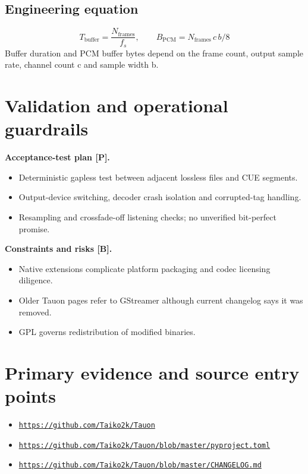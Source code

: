\documentclass[10pt,a4paper,oneside]{report}
\newcommand{\sourceurl}[1]{\href{#1}{\texttt{\nolinkurl{#1}}}}
\begin{document}
\subsection*{Engineering equation}
\begin{equation*}T_{\mathrm{buffer}}=\frac{N_{\mathrm{frames}}}{f_s},\qquad B_{\mathrm{PCM}}=N_{\mathrm{frames}}\,c\,b/8\end{equation*}
Buffer duration and PCM buffer bytes depend on the frame count, output sample rate, channel count c and sample width b.\par
\section{Validation and operational guardrails}
\textbf{Acceptance-test plan [P].}\par
\begin{itemize}[leftmargin=*,itemsep=2pt,topsep=3pt]
\item Deterministic gapless test between adjacent lossless files and CUE segments.
\item Output-device switching, decoder crash isolation and corrupted-tag handling.
\item Resampling and crossfade-off listening checks; no unverified bit-perfect promise.
\end{itemize}
\textbf{Constraints and risks [B].}\par
\begin{itemize}[leftmargin=*,itemsep=2pt,topsep=3pt]
\item Native extensions complicate platform packaging and codec licensing diligence.
\item Older Tauon pages refer to GStreamer although current changelog says it was removed.
\item GPL governs redistribution of modified binaries.
\end{itemize}
\section*{Primary evidence and source entry points}
\begin{itemize}[leftmargin=*,itemsep=1pt,topsep=1pt]
\item \sourceurl{https://github.com/Taiko2k/Tauon}
\item \sourceurl{https://github.com/Taiko2k/Tauon/blob/master/pyproject.toml}
\item \sourceurl{https://github.com/Taiko2k/Tauon/blob/master/CHANGELOG.md}
\end{itemize}
\clearpage
\end{document}
